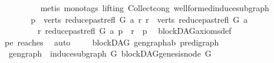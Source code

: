 \begin{isabellebody}
\ \ \ \ \ \ \ \ \isamarkupfalse%
\ {\isacharparenleft}{\kern0pt}metis\ {\isacharparenleft}{\kern0pt}mono{\isacharunderscore}{\kern0pt}tags{\isacharcomma}{\kern0pt}\ lifting{\isacharparenright}{\kern0pt}\ Collect{\isacharunderscore}{\kern0pt}cong\ wellformed{\isacharunderscore}{\kern0pt}induce{\isacharunderscore}{\kern0pt}subgraph{\isacharparenright}{\kern0pt}\isanewline
\ \ \ \ \isamarkupfalse%
\isanewline
\ \ \ \ \isamarkupfalse%
\ \isamarkupfalse%
\ {\isachardoublequoteopen}{\isasymexists}p\ {\isasymin}\ verts\ {\isacharparenleft}{\kern0pt}reduce{\isacharunderscore}{\kern0pt}past{\isacharunderscore}{\kern0pt}refl\ G\ a{\isacharparenright}{\kern0pt}{\isachardot}{\kern0pt}\ {\isacharparenleft}{\kern0pt}{\isasymforall}r{\isachardot}{\kern0pt}\ r\ {\isasymin}\ verts\ {\isacharparenleft}{\kern0pt}reduce{\isacharunderscore}{\kern0pt}past{\isacharunderscore}{\kern0pt}refl\ G\ a{\isacharparenright}{\kern0pt}\ \isanewline
\ \ \ \ \ \ \ \ {\isasymlongrightarrow}\ {\isacharparenleft}{\kern0pt}r\ {\isasymrightarrow}\isactrlsup {\isacharplus}{\kern0pt}\isactrlbsub reduce{\isacharunderscore}{\kern0pt}past{\isacharunderscore}{\kern0pt}refl\ G\ a\isactrlesub \ p\ {\isasymor}\ r\ {\isacharequal}{\kern0pt}\ p{\isacharparenright}{\kern0pt}{\isacharparenright}{\kern0pt}{\isachardoublequoteclose}\ \isamarkupfalse%
\ blockDAG{\isacharunderscore}{\kern0pt}axioms{\isacharunderscore}{\kern0pt}def\ \isanewline
\ \ \ \ \ \ \isamarkupfalse%
\ pe\ reaches\ \isamarkupfalse%
\ auto\isanewline
\ \ \isamarkupfalse%
\isanewline
{}\isamarkupfalse%
%
\endisatagproof
{\isafoldproof}%
%
\isadelimproof
%
\endisadelimproof
%
\isadelimdocument
%
\endisadelimdocument
%
\isatagdocument
%
\isamarkuptrue%
%
\endisatagdocument
{\isafolddocument}%
%
\isadelimdocument
%
\endisadelimdocument
{}\isamarkupfalse%
\ {\isacharparenleft}{\kern0pt}\ blockDAG{\isacharparenright}{\kern0pt}\ gen{\isacharunderscore}{\kern0pt}graph{\isacharcolon}{\kern0pt}{\isacharcolon}{\kern0pt}{\isachardoublequoteopen}{\isacharparenleft}{\kern0pt}{\isacharprime}{\kern0pt}a{\isacharcomma}{\kern0pt}{\isacharprime}{\kern0pt}b{\isacharparenright}{\kern0pt}\ pre{\isacharunderscore}{\kern0pt}digraph{\isachardoublequoteclose}\ \ \isanewline
\ \ {\isachardoublequoteopen}gen{\isacharunderscore}{\kern0pt}graph\ {\isacharequal}{\kern0pt}\ induce{\isacharunderscore}{\kern0pt}subgraph\ G\ {\isacharbraceleft}{\kern0pt}blockDAG{\isachardot}{\kern0pt}genesis{\isacharunderscore}{\kern0pt}node\ G{\isacharbraceright}{\kern0pt}{\isachardoublequoteclose}\isanewline

\end{isabellebody}
